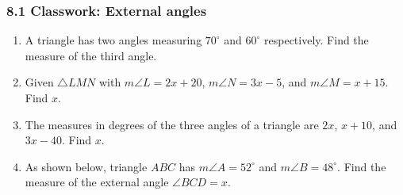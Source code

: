 \documentclass[12pt, twoside]{article}
\begin{document}
\subsubsection*{8.1 Classwork: External angles}
\begin{enumerate}
\item A triangle has two angles measuring $70^\circ$ and $60^\circ$ respectively. Find the measure of the third angle. \vspace{2cm}

\item Given  $\triangle LMN$ with $m\angle L=2x+20$, $m\angle N=3x-5$, and $m\angle M=x+15$. Find $x$.
  \begin{flushright}
  \end{flushright} \vspace{2cm}

\item The measures in degrees of the three angles of a triangle are $2x$, $x+10$, and $3x-40$. Find $x$. \vspace{4cm}

\item As shown below, triangle $ABC$ has $m\angle A = 52^\circ$ and $m\angle B = 48^\circ$. Find the measure of the external angle $\angle BCD = x$.
  \begin{flushleft}
  \end{flushleft}
  

\end{enumerate}
\end{document}

